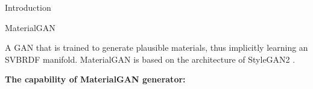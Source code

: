 \documentclass[final]{beamer}
\newlength{\twocolwid}
\newlength{\resLen}
\begin{document}
\begin{frame}[t]
\begin{columns}[t]
\begin{column}{\twocolwid}
\begin{block}{Introduction}
        \end{block}
        
        \vspace{1cm}
        
        \begin{block}{MaterialGAN}
            \large{
				A GAN that is trained to generate plausible materials, thus implicitly learning an SVBRDF manifold. 
				MaterialGAN is based on the architecture of StyleGAN2 \cite{karras2020}.
				
				\vspace{1cm}
				
				\textbf{The capability of MaterialGAN generator:}
			}
		
	        \setlength{\resLen}{1.8in}
			\begin{figure}
				\centering
				\begin{tabular}{ccccccc}

\end{tabular}
\end{figure}
\end{block}
\end{column}
\end{columns}
\end{frame}
\end{document}

